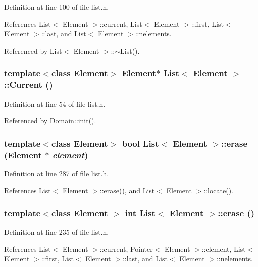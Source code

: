 Definition at line 100 of file list.h.

References List$<$ Element $>$::current, List$<$ Element $>$::first, List$<$ Element $>$::last, and List$<$ Element $>$::nelements.

Referenced by List$<$ Element $>$::$\sim$List().\hypertarget{classList_1e1f9ae5124cf7d18871fcd68e579d29}{
\subsubsection[{Current}]{\setlength{\rightskip}{0pt plus 5cm}template$<$class Element$>$ Element$\ast$ {\bf List}$<$ Element $>$::Current ()}}
\label{classList_1e1f9ae5124cf7d18871fcd68e579d29}




Definition at line 54 of file list.h.

Referenced by Domain::init().\hypertarget{classList_c32f4741e6ac1c9115a062a3bbf7f945}{
\subsubsection[{erase}]{\setlength{\rightskip}{0pt plus 5cm}template$<$class Element$>$ bool {\bf List}$<$ Element $>$::erase (Element $\ast$ {\em element})}}
\label{classList_c32f4741e6ac1c9115a062a3bbf7f945}




Definition at line 287 of file list.h.

References List$<$ Element $>$::erase(), and List$<$ Element $>$::locate().\hypertarget{classList_a6817f9dc3c692ec329e876bf947438b}{
\subsubsection[{erase}]{\setlength{\rightskip}{0pt plus 5cm}template$<$class Element $>$ int {\bf List}$<$ Element $>$::erase ()}}
\label{classList_a6817f9dc3c692ec329e876bf947438b}




Definition at line 235 of file list.h.

References List$<$ Element $>$::current, Pointer$<$ Element $>$::element, List$<$ Element $>$::first, List$<$ Element $>$::last, and List$<$ Element $>$::nelements.

